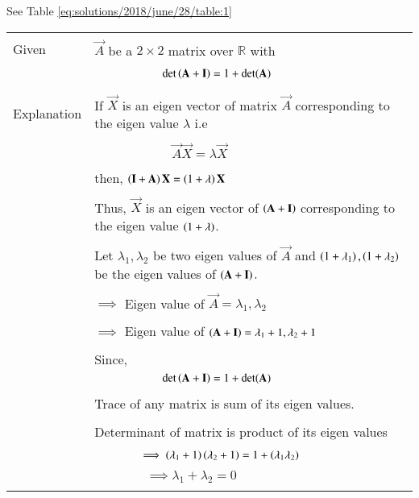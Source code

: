 See Table     \ref{eq:solutions/2018/june/28/table:1}

\onecolumn
\begin{longtable}{|p{5cm}|p{13cm}|}
\hline
    \multirow{3}{*}{Given} 
    &\\
     & $\vec{A}$ be a $2\times2$ matrix over $\mathbb{R}$ with\\
     &\\
      &$\qquad\qquad \qquad \det\left(\mathbf{A}+\mathbf{I}\right)=1+\det(\mathbf{A})$\\
      &\\
     \hline
     \multirow{3}{*}{Explanation} &\\
     & If $\vec{X}$ is an eigen vector of matrix $\vec{A}$
     corresponding to the eigen value $\lambda$ i.e \\
     &\\
     & $\qquad\qquad\qquad\vec{A}\vec{X}=\lambda\vec{X}$\\
     &\\
     & then, $\left(\mathbf{I}+\mathbf{A}\right)\mathbf{X}=\left(1+\lambda\right)\mathbf{X}$\\
     &\\
     &Thus, $\vec{X}$ is an eigen vector of $\left(\mathbf{A}+\mathbf{I}\right)$ corresponding to the eigen value $\left(1+\lambda\right)$.\\
     
     &\\
     
     & Let $\lambda_1,\lambda_2$ be two eigen values of $\vec{A}$ and $\left(1+\lambda_1\right),\left(1+\lambda_2\right)$ be the eigen values of $\left(\mathbf{A}+\mathbf{I}\right).$\\
    &\\
    & $\implies$ Eigen value of $\vec{A}=\lambda_1,\lambda_2$\\
    &\\
    &  $\implies$ Eigen value of $\left(\mathbf{A}+\mathbf{I}\right) = \lambda_1+1,\lambda_2+1$\\
    &\\
    & Since,\\
    \hline
    &$\qquad\qquad \qquad \det\left(\mathbf{A}+\mathbf{I}\right)=1+\det(\mathbf{A})$\\
    &\\
     & Trace of any matrix is sum of its eigen values. \\
    &\\
    & Determinant of matrix is product of its eigen values \\
    &\\
    & $\qquad\qquad\implies \left(\lambda_1+1\right)\left(\lambda_2+1\right)=1+\left(\lambda_1\lambda_2\right)$\\
    &\\
    &$\qquad\qquad\implies\boxed{ \lambda_1+\lambda_2 = 0}$\\
    &\\
   

\end{longtable}
